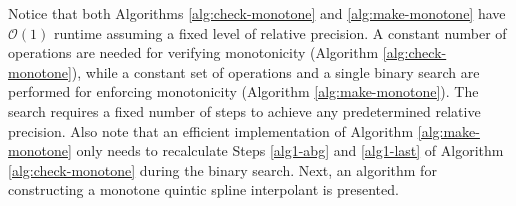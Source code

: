 \documentclass{scspaperproc}
\theoremstyle{scsthe}
\begin{document}
Notice that both Algorithms \ref{alg:check-monotone} and \ref{alg:make-monotone} have $\mathcal{O}(1)$ runtime  assuming a fixed level of relative precision. A constant number of operations are needed for verifying monotonicity (Algorithm \ref{alg:check-monotone}), while a constant set of operations and a single binary search are performed for enforcing monotonicity (Algorithm \ref{alg:make-monotone}). The search requires a fixed number of steps to achieve any predetermined relative precision. Also note that an efficient implementation of Algorithm \ref{alg:make-monotone} only needs to recalculate Steps \ref{alg1-abg} and \ref{alg1-last} of Algorithm \ref{alg:check-monotone} during the binary search. Next, an algorithm for constructing a monotone quintic spline interpolant is presented.

\end{document}
